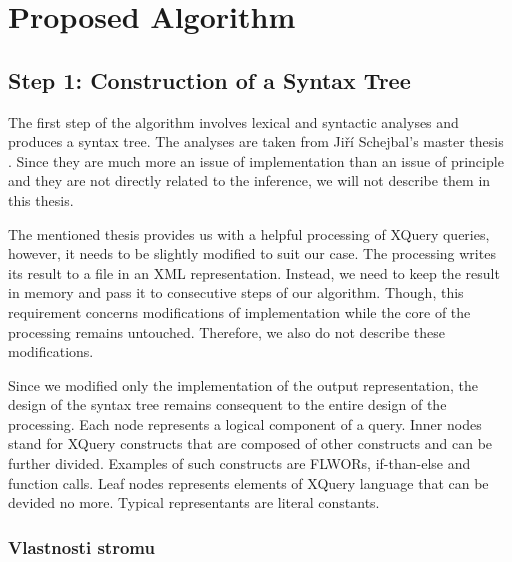 \chapter{Proposed Algorithm}

\section{Step 1: Construction of a Syntax Tree}
The first step of the algorithm involves lexical and syntactic analyses and produces a syntax tree. The analyses are taken from Ji\v r\'{i} Schejbal's master thesis . Since they are much more an issue of implementation than an issue of principle and they are not directly related to the inference, we will not describe them in this thesis.

The mentioned thesis provides us with a helpful processing of XQuery queries, however, it needs to be slightly modified to suit our case. The processing writes its result to a file in an XML representation. Instead, we need to keep the result in memory and pass it to consecutive steps of our algorithm. Though, this requirement concerns modifications of implementation while the core of the processing remains untouched. Therefore, we also do not describe these modifications.

Since we modified only the implementation of the output representation, the design of the syntax tree remains consequent to the entire design of the processing. Each node represents a logical component of a query. Inner nodes stand for XQuery constructs that are composed of other constructs and can be further divided. Examples of such constructs are FLWORs, if-than-else and function calls. Leaf nodes represents elements of XQuery language that can be devided no more. Typical representants are literal constants. 


\subsection{Vlastnosti stromu}

